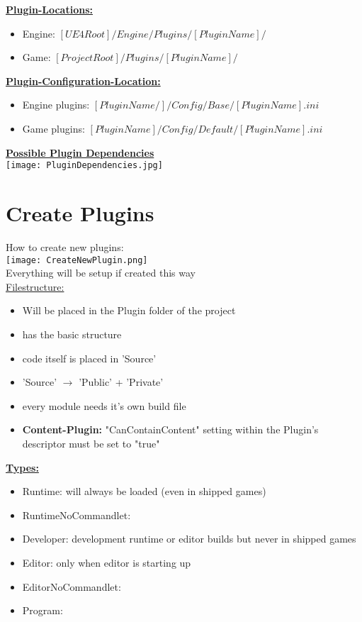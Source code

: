         \uline{\textbf{Plugin-Locations:}}
        \begin{itemize}
            \item Engine: $[UE4 Root]/Engine/Plugins/[Plugin Name]/$
            \item Game: $[Project Root]/Plugins/[PluginName]/$
        \end{itemize}

        \uline{\textbf{Plugin-Configuration-Location:}}
        \begin{itemize}
            \item Engine plugins: $[PluginName/]/Config/Base/[PluginName].ini$
            \item Game plugins: $[PluginName]/Config/Default/[PluginName].ini$
        \end{itemize}

        \uline{\textbf{Possible Plugin Dependencies}} \\
        \texttt{[image: PluginDependencies.jpg]}

        \section{Create Plugins}
            How to create new plugins: \\
            \texttt{[image: CreateNewPlugin.png]} \\
            Everything will be setup if created this way \\
            \underline{Filestructure:}
            \begin{itemize}
                \item Will be placed in the Plugin folder of the project
                \item has the basic structure
                \item code itself is placed in 'Source'
                \item 'Source' $\rightarrow$ 'Public' + 'Private'
                \item every module needs it's own build file
                \item \textbf{Content-Plugin:} "CanContainContent" setting within the Plugin's descriptor must be set to "true"
            \end{itemize}
            
            \uline{\textbf{Types:}}
            \begin{itemize}
                \item Runtime: will always be loaded (even in shipped games)
                \item RuntimeNoCommandlet:
                \item Developer: development runtime or editor builds but never in shipped games
                \item Editor: only when editor is starting up
                \item EditorNoCommandlet:
                \item Program:
            \end{itemize}

